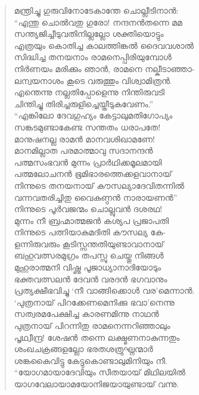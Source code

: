 \begin{verse}
മന്ത്രിച്ചു ഗുരുവിനോടേകാന്തേ ചൊല്ലീടിനാന്‍:\\
“എന്തു ചൊല്‍വതു ഗുരോ! നന്ദനന്‍തന്നെ മമ\\
സന്ത്യജിച്ചീടുവതിനില്ലല്ലോ ശക്തിയൊട്ടും\\
എത്രയും കൊതിച്ച കാലത്തിങ്കല്‍ ദൈവവശാല്‍\\
സിദ്ധിച്ച തനയനാം രാമനെപ്പിരിയുമ്പോള്‍\\
നിര്‍ണയം മരിക്കും ഞാന്‍, രാമനെ നല്കീടാഞ്ഞാ-\\
ലന്വയനാശം കൂടെ വരുത്തും വിശ്വാമിത്രന്‍.\\
എന്തെന്നു നല്ലതിപ്പോളെന്നു നിന്തിരുവടി\\
ചിന്തിച്ചു തിരിച്ചരുളിച്ചെയ്തീടുകവേണം.”\\
“എങ്കിലോ ദേവഗുഹ്യം കേട്ടാലുമതിഗോപ്യം\\
സങ്കടമുണ്ടാകേണ്ട സന്തതം ധരാപതേ!\\
മാനുഷനല്ല രാമന്‍ മാനവശിഖാമണേ!\\
മാനമില്ലാത പരമാത്മാവു സദാനന്ദന്‍\\
പത്മസംഭവന്‍ മുന്നം പ്രാര്‍ഥിക്കമൂലമായി\\
പത്മലോചനന്‍ ഭൂമിഭാരത്തെക്കളവാനായ്\\
നിന്നുടെ തനയനായ് കൗസല്യാദേവിതന്നില്‍\\
വന്നവതരിച്ചിതു വൈകുണ്ഠന്‍ നാരായണന്‍”\\
നിന്നുടെ പൂര്‍വജന്മം ചൊല്ലുവന്‍ ദശരഥ!\\
മുന്നം നീ ബ്രഹ്മാത്മജന്‍ കശ്യപ പ്രജാപതി\\
നിന്നുടെ പത്നിയാകുമദിതി കൗസല്യ കേ-\\
ളന്നിരുവരും കൂടിസ്സന്തതിയുണ്ടാവാനായ്\\
ബഹുവത്സരമുഗ്രം തപസ്സു ചെയ്തു നിങ്ങള്‍\\
മുഹുരാത്മനി വിഷ്ണു പൂജാധ്യാനാദിയോടും\\
ഭക്തവത്സലന്‍ ദേവന്‍ വരദന്‍ ഭഗവാനും\\
പ്രത്യക്ഷീഭവിച്ചു ‘നീ വാങ്ങിക്കൊള്‍ വര’മെന്നാന്‍.\\
‘പുത്രനായ് പിറക്കേണമെനിക്കു ഭവാ’നെന്നു\\
സത്വരമപേക്ഷിച്ച കാരണമിന്നു നാഥന്‍\\
പുത്രനായ് പിറന്നിതു രാമനെന്നറിഞ്ഞാലും\\
പൃഥ്വീന്ദ്ര! ശേഷന്‍ തന്നെ ലക്ഷ്മണനാകുന്നതും\\
ശംഖചക്രങ്ങളല്ലോ ഭരതശത്രുഘ്നന്മാര്‍\\
ശങ്കകൈവിട്ടു കേട്ടുകൊണ്ടാലുമിനിയും നീ.\\
“യോഗമായാദേവിയും സീതയായ് മിഥിലയില്‍\\
യാഗവേലായാമയോനിജയായുണ്ടായ് വന്നു.\\

\end{verse}
